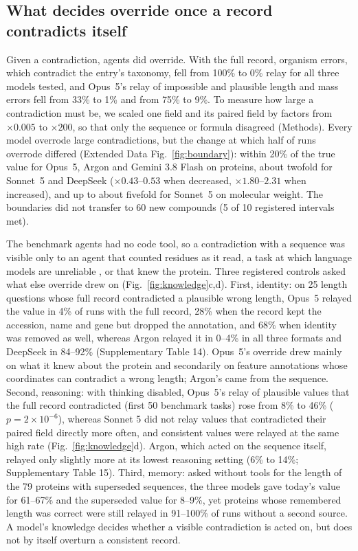 \subsection*{What decides override once a record contradicts itself}

Given a contradiction, agents did override. With the full record, organism errors, which contradict the entry's taxonomy, fell from 100\% to 0\% relay for all three models tested, and Opus~5's relay of impossible and plausible length and mass errors fell from 33\% to 1\% and from 75\% to 9\%. To measure how large a contradiction must be, we scaled one field and its paired field by factors from $\times0.005$ to $\times200$, so that only the sequence or formula disagreed (Methods). Every model overrode large contradictions, but the change at which half of runs overrode differed (Extended Data Fig.~\ref{fig:boundary}): within 20\% of the true value for Opus~5, Argon and Gemini 3.8 Flash on proteins, about twofold for Sonnet~5 and DeepSeek ($\times0.43$--$0.53$ when decreased, $\times1.80$--$2.31$ when increased), and up to about fivefold for Sonnet~5 on molecular weight. The boundaries did not transfer to 60 new compounds (5 of 10 registered intervals met).

The benchmark agents had no code tool, so a contradiction with a sequence was visible only to an agent that counted residues as it read, a task at which language models are unreliable \citep{zhang2024counting}, or that knew the protein. Three registered controls asked what else override drew on (Fig.~\ref{fig:knowledge}c,d). First, identity: on 25 length questions whose full record contradicted a plausible wrong length, Opus~5 relayed the value in 4\% of runs with the full record, 28\% when the record kept the accession, name and gene but dropped the annotation, and 68\% when identity was removed as well, whereas Argon relayed it in 0--4\% in all three formats and DeepSeek in 84--92\% (Supplementary Table 14). Opus~5's override drew mainly on what it knew about the protein and secondarily on feature annotations whose coordinates can contradict a wrong length; Argon's came from the sequence. Second, reasoning: with thinking disabled, Opus~5's relay of plausible values that the full record contradicted (first 50 benchmark tasks) rose from 8\% to 46\% ($p = 2\times10^{-6}$), whereas Sonnet 5 did not relay values that contradicted their paired field directly more often, and consistent values were relayed at the same high rate (Fig.~\ref{fig:knowledge}d). Argon, which acted on the sequence itself, relayed only slightly more at its lowest reasoning setting (6\% to 14\%; Supplementary Table 15). Third, memory: asked without tools for the length of the 79 proteins with superseded sequences, the three models gave today's value for 61--67\% and the superseded value for 8--9\%, yet proteins whose remembered length was correct were still relayed in 91--100\% of runs without a second source. A model's knowledge decides whether a visible contradiction is acted on, but does not by itself overturn a consistent record.




